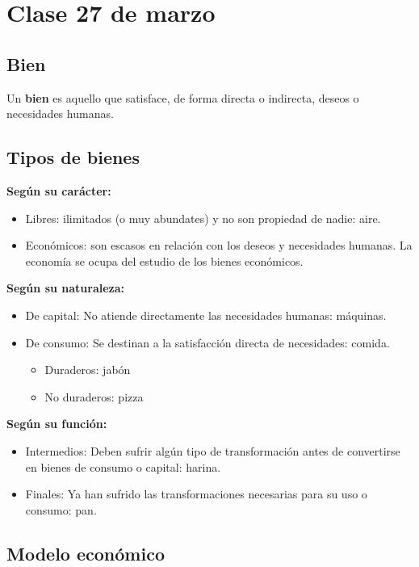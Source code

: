 \section{Clase 27 de marzo}

\subsection{Bien}

Un \textbf{bien} es aquello que satisface,
de forma directa o indirecta,
deseos o necesidades humanas.

\subsection{Tipos de bienes}

\textbf{Según su carácter:}
\begin{itemize}
    \item Libres:
          ilimitados (o muy abundates) y no son propiedad de nadie: aire.
    \item Económicos:
          son escasos en relación con los deseos y necesidades humanas.
          La economía se ocupa del estudio de los bienes económicos.
\end{itemize}

\textbf{Según su naturaleza:}
\begin{itemize}
    \item De capital:
          No atiende directamente las necesidades humanas:
          máquinas.
    \item De consumo:
          Se destinan a la satisfacción directa de necesidades:
          comida.
          \begin{itemize}
              \item Duraderos: jabón
              \item No duraderos: pizza
          \end{itemize}
\end{itemize}

\textbf{Según su función:}
\begin{itemize}
    \item Intermedios:
          Deben sufrir algún tipo de transformación antes de convertirse en bienes de consumo o capital: harina.
    \item Finales:
          Ya han sufrido las transformaciones necesarias para su uso o consumo: pan.
\end{itemize}

\subsection{Modelo económico}

